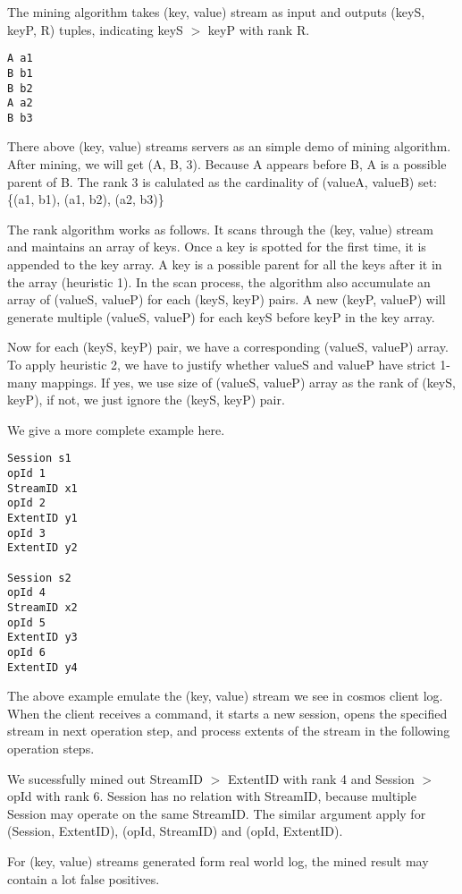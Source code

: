 The mining algorithm takes (key, value) stream as input and
outputs (keyS, keyP, R) tuples, indicating keyS $>$ keyP
with rank R.

\begin{verbatim}
A a1
B b1
B b2
A a2
B b3
\end{verbatim}

There above (key, value) streams servers as an simple demo
of mining algorithm. After mining, we will get (A, B, 3).
Because A appears before B, A is a possible parent of B. The
rank 3 is calulated as the cardinality of (valueA, valueB)
set: \{(a1, b1), (a1, b2), (a2, b3)\}

The rank algorithm works as follows. It scans through the
(key, value) stream and maintains an array of keys. Once a
key is spotted for the first time, it is appended to the key
array. A key is a possible parent for all the keys after it
in the array (heuristic 1). In the scan process, the algorithm also
accumulate an array of (valueS, valueP) for each (keyS, keyP)
pairs. A new (keyP, valueP) will generate multiple (valueS,
valueP) for each keyS before keyP in the key array.

Now for each (keyS, keyP) pair, we have a corresponding
(valueS, valueP) array. To apply heuristic 2, we have to
justify whether valueS and valueP have strict 1-many
mappings. If yes, we use size of (valueS, valueP) array
as the rank of (keyS, keyP), if not, we just ignore the
(keyS, keyP) pair.


We give a more complete example here.
\begin{verbatim}
Session s1
opId 1
StreamID x1
opId 2
ExtentID y1
opId 3
ExtentID y2

Session s2
opId 4
StreamID x2
opId 5
ExtentID y3
opId 6
ExtentID y4
\end{verbatim}
The above example emulate the (key, value) stream we see in
cosmos client log. When the client receives a command, it
starts a new session, opens the specified stream in next
operation step, and process extents of the stream in the
following operation steps.

We sucessfully mined out StreamID $>$ ExtentID with rank 4
and Session $>$ opId with rank 6. Session has no relation
with StreamID, because multiple Session may operate on the
same StreamID. The similar argument apply for (Session,
ExtentID), (opId, StreamID) and (opId, ExtentID).

For (key, value) streams generated form real world log, the
mined result may contain a lot false positives.

